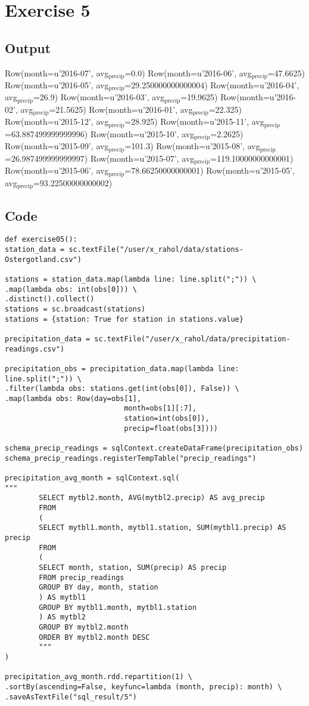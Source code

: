 \documentclass[10pt]{article}
\begin{document}
\section*{Exercise 5}
\label{sec-5}
\subsection*{Output}
\label{sec-5-1}
Row(month=u'2016-07', avg$_{\text{precip}}$=0.0)
Row(month=u'2016-06', avg$_{\text{precip}}$=47.6625)
Row(month=u'2016-05', avg$_{\text{precip}}$=29.250000000000004)
Row(month=u'2016-04', avg$_{\text{precip}}$=26.9)
Row(month=u'2016-03', avg$_{\text{precip}}$=19.9625)
Row(month=u'2016-02', avg$_{\text{precip}}$=21.5625)
Row(month=u'2016-01', avg$_{\text{precip}}$=22.325)
Row(month=u'2015-12', avg$_{\text{precip}}$=28.925)
Row(month=u'2015-11', avg$_{\text{precip}}$=63.887499999999996)
Row(month=u'2015-10', avg$_{\text{precip}}$=2.2625)
Row(month=u'2015-09', avg$_{\text{precip}}$=101.3)
Row(month=u'2015-08', avg$_{\text{precip}}$=26.987499999999997)
Row(month=u'2015-07', avg$_{\text{precip}}$=119.10000000000001)
Row(month=u'2015-06', avg$_{\text{precip}}$=78.66250000000001)
Row(month=u'2015-05', avg$_{\text{precip}}$=93.22500000000002)
\subsection*{Code}
\label{sec-5-2}
\begin{verbatim}
def exercise05():
station_data = sc.textFile("/user/x_rahol/data/stations-Ostergotland.csv")

stations = station_data.map(lambda line: line.split(";")) \
.map(lambda obs: int(obs[0])) \
.distinct().collect()
stations = sc.broadcast(stations)
stations = {station: True for station in stations.value}

precipitation_data = sc.textFile("/user/x_rahol/data/precipitation-readings.csv")

precipitation_obs = precipitation_data.map(lambda line: line.split(";")) \
.filter(lambda obs: stations.get(int(obs[0]), False)) \
.map(lambda obs: Row(day=obs[1],
                            month=obs[1][:7],
                            station=int(obs[0]),
                            precip=float(obs[3])))

schema_precip_readings = sqlContext.createDataFrame(precipitation_obs)
schema_precip_readings.registerTempTable("precip_readings")

precipitation_avg_month = sqlContext.sql(
"""
        SELECT mytbl2.month, AVG(mytbl2.precip) AS avg_precip
        FROM
        (
        SELECT mytbl1.month, mytbl1.station, SUM(mytbl1.precip) AS precip
        FROM
        (
        SELECT month, station, SUM(precip) AS precip
        FROM precip_readings
        GROUP BY day, month, station
        ) AS mytbl1
        GROUP BY mytbl1.month, mytbl1.station
        ) AS mytbl2
        GROUP BY mytbl2.month
        ORDER BY mytbl2.month DESC
        """
)

precipitation_avg_month.rdd.repartition(1) \
.sortBy(ascending=False, keyfunc=lambda (month, precip): month) \
.saveAsTextFile("sql_result/5")
\end{verbatim}
\newpage
\end{document}
